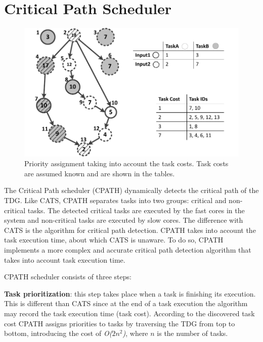 \section{Critical Path Scheduler}
\label{sec.scheduling.cpath}
\begin{figure}[tr]
\includegraphics[width=\columnwidth]{images/cpath_priorities.pdf} 
\centering
\caption{Priority assignment taking into account the task costs. Task costs are assumed known and are shown in the tables.}
\label{cpath}
\vspace{-0.5cm}
\end{figure}


The Critical Path scheduler (CPATH) dynamically detects the critical path of the TDG.
Like CATS, CPATH separates tasks into two groups: critical and non-critical tasks.
The detected critical tasks are executed by the fast cores in the system and non-critical tasks are executed by slow cores.
The difference with CATS is the algorithm for critical path detection.
CPATH takes into account the task execution time, about which CATS is unaware.
To do so, CPATH implements a more complex and accurate critical path detection algorithm that takes into account task execution time.

CPATH scheduler consists of three steps:

\textbf{Task prioritization}: this step takes place when a task is finishing its execution. This is different than CATS since at the end of a task execution the algorithm may record the task execution time (task cost).
According to the discovered task cost CPATH assigns priorities to tasks by traversing the TDG from top to bottom, introducing the cost of \textit{O($2n^2$)}, where \textit{$n$} is the number of tasks.

